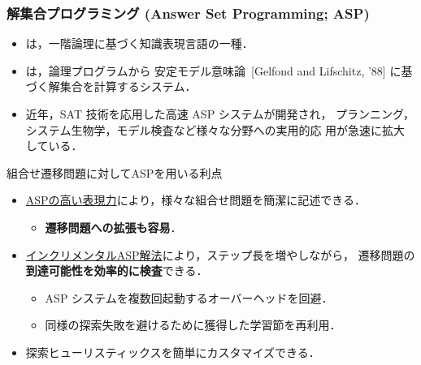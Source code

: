 \documentclass[dvipdfmx,11pt]{beamer}
\begin{document}
\begin{frame}
  \frametitle{解集合プログラミング {\large(Answer Set Programming; ASP)}}
  \begin{itemize}
  \item {}は，一階論理に基づく知識表現言語の一種．
  \item {}は，論理プログラムから
    安定モデル意味論~{\scriptsize[Gelfond and Lifschitz, '88]}
    に基づく解集合を計算するシステム．
  \item 近年，SAT 技術を応用した高速 ASP システムが開発され，
    プランニング，システム生物学，モデル検査など様々な分野への実用的応
    用が急速に拡大している．
  \end{itemize}

  \begin{alertblock}{組合せ遷移問題に対してASPを用いる利点}
    \begin{itemize}
    \item \underline{ASPの高い表現力}により，様々な組合せ問題を簡潔に記述できる．
      \begin{itemize}
      \item \textbf{遷移問題への拡張も容易}．
      \end{itemize}
    \item \underline{インクリメンタルASP解法}により，ステップ長を増やしながら，
      遷移問題の\textbf{到達可能性を効率的に検査}できる．
      \begin{itemize}
      \item ASP システムを複数回起動するオーバーヘッドを回避．
      \item 同様の探索失敗を避けるために獲得した学習節を再利用．
      \end{itemize}
    \item 探索ヒューリスティックスを簡単にカスタマイズできる．
    \end{itemize}
  \end{alertblock}
\end{frame}
\end{document}

